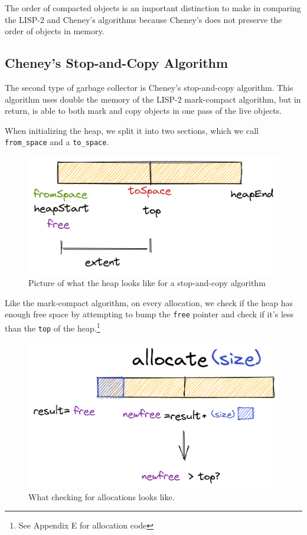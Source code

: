 \documentclass[index]{subfiles}
\begin{document}
The order of compacted objects is an important distinction to make in comparing the LISP-2 and Cheney's algorithms because Cheney's does not preserve the order of objects in memory.

\subsection{Cheney's Stop-and-Copy Algorithm}

The second type of garbage collector is Cheney's stop-and-copy algorithm. This algorithm uses double the memory of the LISP-2 mark-compact algorithm, but in return, is able to both mark and copy objects in one pass of the live objects.

When initializing the heap, we split it into two sections, which we call \verb+from_space+ and a \verb+to_space+\cite[Chapter~2]{gc_handbook}.

\begin{figure}[H]
    \centering
    \includegraphics[scale=0.3]{pics/split-heap-diagram.png}
    \caption{Picture of what the heap looks like for a stop-and-copy algorithm}
\end{figure}

Like the mark-compact algorithm, on every allocation, we check if the heap has enough free space by attempting to bump the \verb+free+ pointer and check if it's less than the \verb+top+ of the heap.\footnote{See Appendix E for allocation code}

\begin{figure}[H]
    \centering
    \includegraphics[scale=0.3]{pics/allocation.png}
    \caption{What checking for allocations looks like.}
\end{figure}
\end{document}
